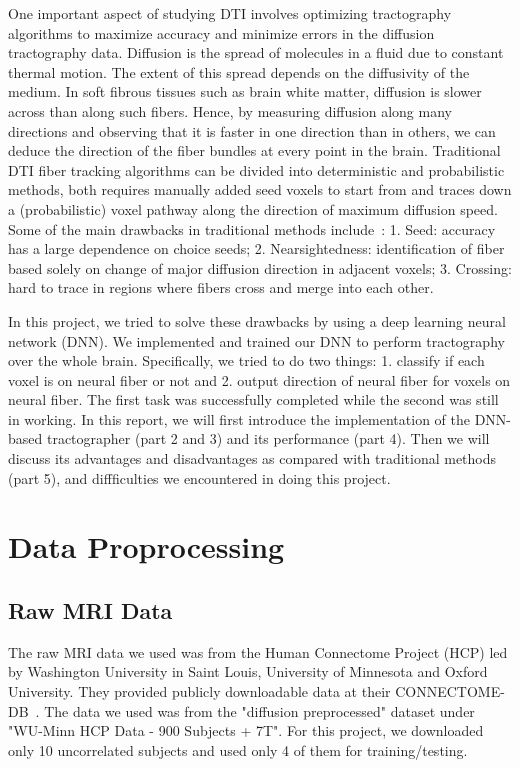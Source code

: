 \documentclass[10pt,twocolumn,letterpaper]{article}
\begin{document}
	One important aspect of studying DTI involves optimizing tractography algorithms to maximize accuracy and minimize errors in the diffusion tractography data. Diffusion is the spread of molecules in a fluid due to constant thermal motion. The extent of this spread depends on the diffusivity of the medium. In soft fibrous tissues such as brain white matter, diffusion is slower across than along such fibers. Hence, by measuring diffusion along many directions and observing that it is faster in one direction than in others, we can deduce the direction of the fiber bundles at every point in the brain. Traditional DTI fiber tracking algorithms can be divided into deterministic and probabilistic methods, both requires manually added seed voxels to start from and traces down a (probabilistic) voxel pathway along the direction of maximum diffusion speed. Some of the main drawbacks in traditional methods include~\cite{basser2000vivo}: 1. Seed: accuracy has a large dependence on choice seeds; 2. Nearsightedness: identification of fiber based solely on change of major diffusion direction in adjacent voxels; 3. Crossing: hard to trace in regions where fibers cross and merge into each other.
	
	In this project, we tried to solve these drawbacks by using a deep learning neural network (DNN). We implemented and trained our DNN to perform tractography over the whole brain. Specifically, we tried to do two things: 1. classify if each voxel is on neural fiber or not and 2. output direction of neural fiber for voxels on neural fiber. The first task was successfully completed while the second was still in working. In this report, we will first introduce the implementation of the DNN-based tractographer (part 2 and 3) and its performance (part 4). Then we will discuss its advantages and disadvantages as compared with traditional methods (part 5), and diffficulties we encountered in doing this project.
	
	\section{Data Proprocessing}
	
	\subsection{Raw MRI Data}
	
	The raw MRI data we used was from the Human Connectome Project (HCP) led by Washington University in Saint Louis, University of Minnesota and Oxford University. They provided publicly downloadable data at their CONNECTOME-DB~\cite{humanconnect}. The data we used was from the "diffusion preprocessed" dataset under "WU-Minn HCP Data - 900 Subjects + 7T". For this project, we downloaded only 10 uncorrelated subjects and used only 4 of them for training/testing.
	
\end{document}
